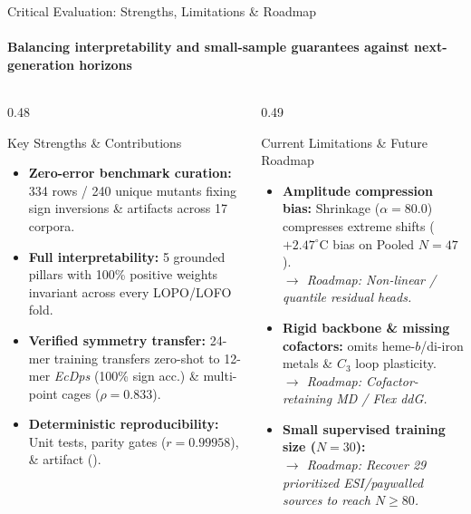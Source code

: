 \documentclass[aspectratio=169,10pt]{beamer}
\newcommand{\code}[1]{\texttt{\detokenize{#1}}}
\begin{document}
\begin{frame}{Critical Evaluation: Strengths, Limitations \& Roadmap}
  \framesubtitle{Balancing interpretability and small-sample guarantees against next-generation horizons}

  \begin{columns}[T,totalwidth=\textwidth]
    \begin{column}{0.48\textwidth}
      \begin{exampleblock}{\footnotesize Key Strengths \& Contributions}
        \fontsize{8.1}{10.5}\selectfont
        \begin{itemize}
          \item \textbf{Zero-error benchmark curation:} 334 rows / 240 unique mutants fixing sign inversions \& artifacts across 17 corpora.
          \item \textbf{Full interpretability:} 5 grounded pillars with 100\% positive weights invariant across every LOPO/LOFO fold.
          \item \textbf{Verified symmetry transfer:} 24-mer training transfers zero-shot to 12-mer \textit{EcDps} (100\% sign acc.) \& multi-point cages ($\rho=0.833$).
          \item \textbf{Deterministic reproducibility:} Unit tests, parity gates ($r=0.99958$), \& artifact (\code{169b357c...}).
        \end{itemize}
      \end{exampleblock}
    \end{column}

    \begin{column}{0.49\textwidth}
      \begin{alertblock}{\footnotesize Current Limitations \& Future Roadmap}
        \fontsize{8.1}{10.5}\selectfont
        \begin{itemize}
          \item \textbf{Amplitude compression bias:} Shrinkage ($\alpha=80.0$) compresses extreme shifts ($+2.47^\circ\text{C}$ bias on Pooled $N=47$).\\
          {\color{mpuSlate}\textit{$\rightarrow$ Roadmap: Non-linear / quantile residual heads.}}
          \item \textbf{Rigid backbone \& missing cofactors:} \code{FoldX} omits heme-$b$/di-iron metals \& $C_3$ loop plasticity.\\
          {\color{mpuSlate}\textit{$\rightarrow$ Roadmap: Cofactor-retaining MD / Flex ddG.}}
          \item \textbf{Small supervised training size ($N=30$):}\\
          {\color{mpuSlate}\textit{$\rightarrow$ Roadmap: Recover 29 prioritized ESI/paywalled sources to reach $N \ge 80$.}}
        \end{itemize}
      \end{alertblock}
    \end{column}
  \end{columns}
\end{frame}
\end{document}
